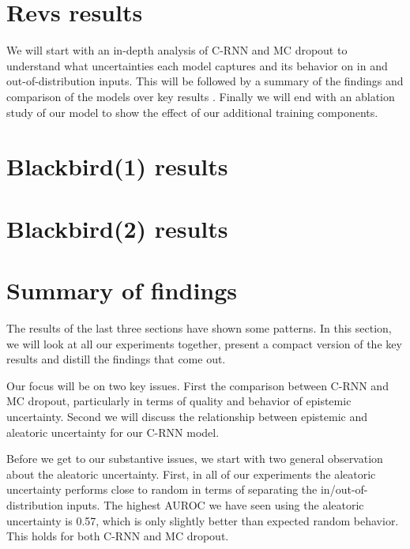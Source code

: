 \documentclass[../main.tex]{subfiles}
\begin{document}
\clearpage
\section{Revs results}
\label{sec:revs_results}

We will start with an in-depth analysis of C-RNN and MC dropout to understand what uncertainties each model captures and its behavior on in and out-of-distribution inputs. This will be followed by a summary of the findings and comparison of the models over key results . Finally we will end with an ablation study of our model to show the effect of our additional training components. 



\clearpage
\section{Blackbird(1) results}


\clearpage
\section{Blackbird(2) results}


\clearpage
\section{Summary of findings}

The results of the last three sections have shown some patterns. In this section, we will look at all our experiments together, present a compact version of the key results and distill the findings that come out.

Our focus will be on two key issues. First the comparison between C-RNN and MC dropout, particularly in terms of quality and behavior of epistemic uncertainty. Second we will discuss the relationship between epistemic and aleatoric uncertainty for our C-RNN model. 

Before we get to our substantive issues, we start with two general observation about the aleatoric uncertainty. First, in all of our experiments the aleatoric uncertainty performs close to random in terms of separating the in/out-of-distribution inputs. The highest AUROC we have seen using the aleatoric uncertainty is 0.57, which is only slightly better than expected random behavior. This holds for both C-RNN and MC dropout. 
\end{document}
